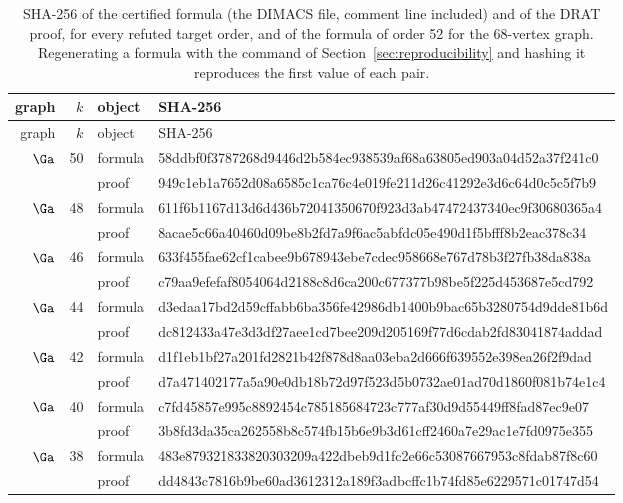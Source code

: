\begin{longtable}{@{}rrll@{}}
\caption{SHA-256 of the certified formula (the DIMACS file, comment line included) and of the DRAT proof, for every refuted target order, and of the formula of order 52 for the 68-vertex graph. Regenerating a formula with the command of Section~\ref{sec:reproducibility} and hashing it reproduces the first value of each pair.}\label{tab:hashes}\\
\toprule
graph & $k$ & object & SHA-256\\
\midrule
\endfirsthead
\toprule
graph & $k$ & object & SHA-256\\
\midrule
\endhead
\bottomrule
\endfoot
\bottomrule
\endlastfoot
$\Ga$ & 50 & formula & {\tiny\ttfamily 58ddbf0f3787268d9446d2b584ec938539af68a63805ed903a04d52a37f241c0} \\
 & & proof & {\tiny\ttfamily 949c1eb1a7652d08a6585c1ca76c4e019fe211d26c41292e3d6c64d0c5c5f7b9} \\
$\Ga$ & 48 & formula & {\tiny\ttfamily 611f6b1167d13d6d436b72041350670f923d3ab47472437340ec9f30680365a4} \\
 & & proof & {\tiny\ttfamily 8acae5c66a40460d09be8b2fd7a9f6ac5abfdc05e490d1f5bfff8b2eac378c34} \\
$\Ga$ & 46 & formula & {\tiny\ttfamily 633f455fae62cf1cabee9b678943ebe7cdec958668e767d78b3f27fb38da838a} \\
 & & proof & {\tiny\ttfamily c79aa9efefaf8054064d2188c8d6ca200c677377b98be5f225d453687e5cd792} \\
$\Ga$ & 44 & formula & {\tiny\ttfamily d3edaa17bd2d59cffabb6ba356fe42986db1400b9bac65b3280754d9dde81b6d} \\
 & & proof & {\tiny\ttfamily dc812433a47e3d3df27aee1cd7bee209d205169f77d6cdab2fd83041874addad} \\
$\Ga$ & 42 & formula & {\tiny\ttfamily d1f1eb1bf27a201fd2821b42f878d8aa03eba2d666f639552e398ea26f2f9dad} \\
 & & proof & {\tiny\ttfamily d7a471402177a5a90e0db18b72d97f523d5b0732ae01ad70d1860f081b74e1c4} \\
$\Ga$ & 40 & formula & {\tiny\ttfamily c7fd45857e995c8892454c785185684723c777af30d9d55449ff8fad87ec9e07} \\
 & & proof & {\tiny\ttfamily 3b8fd3da35ca262558b8c574fb15b6e9b3d61cff2460a7e29ac1e7fd0975e355} \\
$\Ga$ & 38 & formula & {\tiny\ttfamily 483e879321833820303209a422dbeb9d1fc2e66c53087667953c8fdab87f8c60} \\
 & & proof & {\tiny\ttfamily dd4843c7816b9be60ad3612312a189f3adbcffc1b74fd85e6229571c01747d54} \\

\end{longtable}
